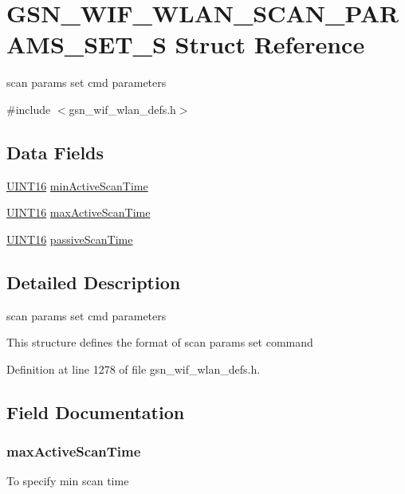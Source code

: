 \hypertarget{a00401}{
\section{GSN\_\-WIF\_\-WLAN\_\-SCAN\_\-PARAMS\_\-SET\_\-S Struct Reference}
\label{a00401}
}


scan params set cmd parameters  




{\ttfamily \#include $<$gsn\_\-wif\_\-wlan\_\-defs.h$>$}

\subsection*{Data Fields}
\begin{DoxyCompactItemize}
\item 
\hyperlink{a00660_ga09f1a1fb2293e33483cc8d44aefb1eb1}{UINT16} \hyperlink{a00401_adcfb1c54474a6d75b454702ff1411c5b}{minActiveScanTime}
\item 
\hyperlink{a00660_ga09f1a1fb2293e33483cc8d44aefb1eb1}{UINT16} \hyperlink{a00401_a2c3a90be92c901056fad09182b0c1884}{maxActiveScanTime}
\item 
\hyperlink{a00660_ga09f1a1fb2293e33483cc8d44aefb1eb1}{UINT16} \hyperlink{a00401_acdde142bdd4db3e1da825d691e9513ea}{passiveScanTime}
\end{DoxyCompactItemize}


\subsection{Detailed Description}
scan params set cmd parameters 

This structure defines the format of scan params set command 

Definition at line 1278 of file gsn\_\-wif\_\-wlan\_\-defs.h.



\subsection{Field Documentation}
\hypertarget{a00401_a2c3a90be92c901056fad09182b0c1884}{
\subsubsection[{maxActiveScanTime}]{ {\bf maxActiveScanTime}}}
\label{a00401_a2c3a90be92c901056fad09182b0c1884}
To specify min scan time 

